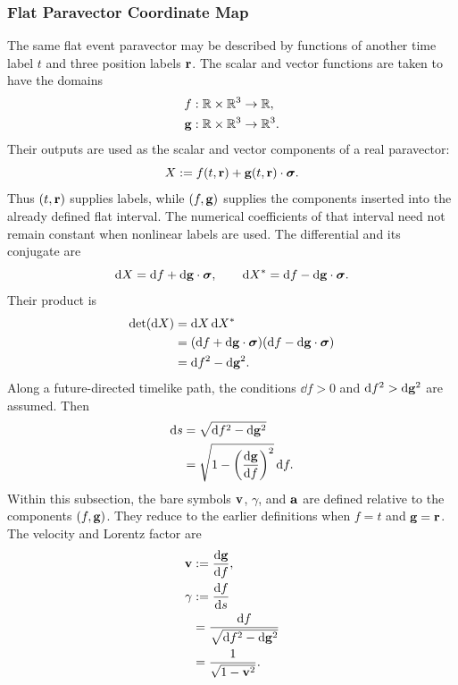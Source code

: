 \subsubsection{Flat Paravector Coordinate Map}
The same flat event paravector may be described by functions of another
time label \(t\) and three position labels \(\mathbf{r}\). The scalar and
vector functions are taken to have the domains
\begin{align*}
f&:\mathbb{R}\times\mathbb{R}^3\to\mathbb{R},\\
\mathbf{g}&:\mathbb{R}\times\mathbb{R}^3\to\mathbb{R}^3.
\end{align*}
Their outputs are used as the scalar and vector components of a real
paravector:
\begin{equation}
X:=f(t,\mathbf{r})+\mathbf{g}(t,\mathbf{r})\cdot\mathbf{\bm{\sigma}}.
\label{eq:flat-paravector-coordinate-map}
\end{equation}
Thus \((t,\mathbf{r})\) supplies labels, while
\((f,\mathbf{g})\) supplies the components inserted into the already defined
flat interval. The numerical coefficients of that interval need not remain
constant when nonlinear labels are used. The differential and its conjugate
are
\begin{equation*}
\mathrm dX=\mathrm d f+\mathrm d\mathbf{g}\cdot\mathbf{\bm{\sigma}},
\qquad
\mathrm dX^{*}=\mathrm d f-\mathrm d\mathbf{g}\cdot\mathbf{\bm{\sigma}}.
\end{equation*}
Their product is
\begin{align*}
\operatorname{det}\!\left(\mathrm dX\right)
&=\mathrm dX\,\mathrm dX^{*}\notag\\
&=(\mathrm d f+\mathrm d\mathbf{g}\cdot\mathbf{\bm{\sigma}})(\mathrm d f-\mathrm d\mathbf{g}\cdot\mathbf{\bm{\sigma}})\notag\\
&=\mathrm d f^2-\mathrm d\mathbf{g}^2.
\end{align*}
Along a future-directed timelike path, the conditions \(\dd f>0\) and
\(\mathrm d f^2>\mathrm d\mathbf{g}^2\) are assumed. Then
\begin{align*}
\mathrm d s
&=\sqrt{\mathrm d f^2-\mathrm d\mathbf{g}^2}\notag\\
&=\sqrt{1-\left(\frac{\mathrm d\mathbf{g}}{\mathrm d f}\right)^2}\,\mathrm d f.
\end{align*}
Within this subsection, the bare symbols \(\mathbf{v}\), \(\gamma\), and
\(\mathbf{a}\) are defined relative to the components \((f,\mathbf{g})\).
They reduce to the earlier definitions when \(f=t\) and \(\mathbf{g}=\mathbf{r}\).
The velocity and Lorentz factor are
\begin{align*}
\mathbf{v}
&:=\frac{\mathrm d\mathbf{g}}{\mathrm d f},\\
\gamma
&:=\frac{\mathrm d f}{\mathrm d s}\notag\\
&=\frac{\mathrm d f}{\sqrt{\mathrm d f^2-\mathrm d\mathbf{g}^2}}\notag\\
&=\frac{1}{\sqrt{1-\mathbf{v}^2}}.
\end{align*}
